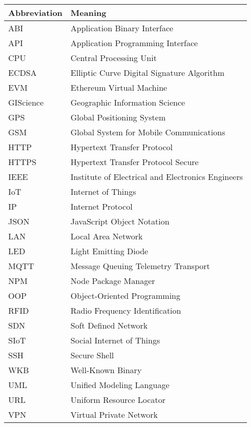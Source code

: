 \begin{tabular}{|l|l|}
  \hline
  \textbf{Abbreviation} & \textbf{Meaning} \\
  \hline
  \label{Acronym-ABI} ABI & Application Binary Interface \\
  \label{Acronym-API} API & Application Programming Interface \\
  \label{Acronym-CPU} CPU & Central Processing Unit \\
  \label{Acronym-ECDSA} ECDSA & Elliptic Curve Digital Signature Algorithm \\
  \label{Acronym-EVM} EVM & Ethereum Virtual Machine \\
  \label{Acronym-GIScience} GIScience & Geographic Information Science \\
  \label{Acronym-GPS} GPS & Global Positioning System \\
  \label{Acronym-GSM} GSM & Global System for Mobile Communications \\
  \label{Acronym-HTTP} HTTP & Hypertext Transfer Protocol \\
  \label{Acronym-HTTPS} HTTPS & Hypertext Transfer Protocol Secure \\
  \label{Acronym-IEEE} IEEE & Institute of Electrical and Electronics Engineers \\
  \label{Acronym-IoT} IoT & Internet of Things \\
  \label{Acronym-IP} IP & Internet Protocol \\
  \label{Acronym-JSON} JSON & JavaScript Object Notation \\
  \label{Acronym-LAN} LAN & Local Area Network \\
  \label{Acronym-LED} LED & Light Emitting Diode \\
  \label{Acronym-MQTT} MQTT & Message Queuing Telemetry Transport \\
  \label{Acronym-NPM} NPM & Node Package Manager \\
  \label{Acronym-OOP} OOP & Object-Oriented Programming \\
  \label{Acronym-RFID} RFID & Radio Frequency Identification \\
  \label{Acronym-SDN} SDN & Soft Defined Network \\
  \label{Acronym-SIoT} SIoT & Social Internet of Things \\
  \label{Acronym-SSH} SSH & Secure Shell \\
  \label{Acronym-WKB} WKB & Well-Known Binary \\
  \label{Acronym-UML} UML & Unified Modeling Language \\
  \label{Acronym-URL} URL & Uniform Resource Locator \\
  \label{Acronym-VPN} VPN & Virtual Private Network \\
  \hline
\end{tabular}
